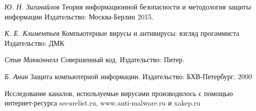 \begin{thebibliography}{00}

\textit{Ю. Н. Зиганайлов} Теория информационной безопасности и методология защиты информации Издательство: Москва-Берлин 2015.

\textit{К. Е. Климентьев} Компьютерные вирусы и антивирусы: взгляд прогаммиста Издательство: ДМК

\textit{Стив Макконнелл} Совершенный код. Издательство: Питер.


\textit{Б. Анин} Защита компьютерной информации. Издательство: БХВ-Петербург, 2000

Исследование каналов, используемые вирусами производилось с помощью интернет-ресурса securelist.ru, www.anti-malware.ru и xakep.ru

\end{thebibliography}